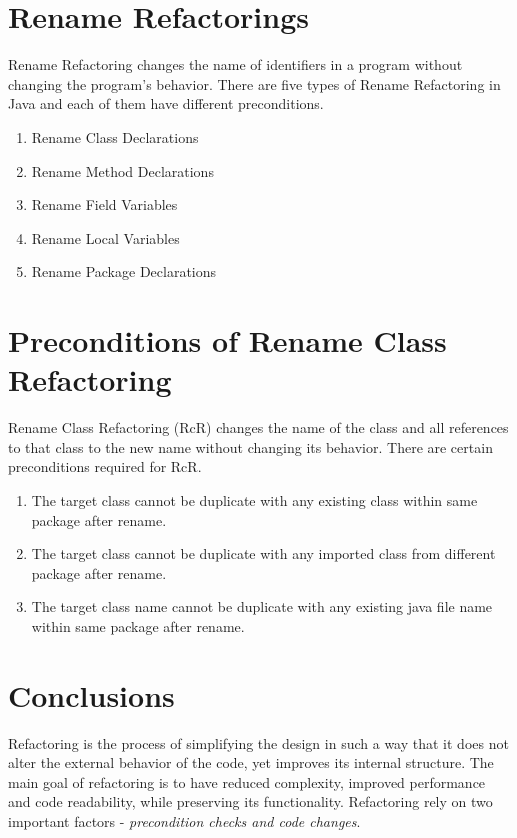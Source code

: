 \documentclass[10pt,conference]{IEEEtran}
\begin{document}
\section{\textbf{Rename Refactorings}}
Rename Refactoring changes the name of identifiers in a program without changing the program's behavior.
There are five types of Rename Refactoring in Java and each of them have different preconditions. 
\begin{enumerate}
	\item Rename Class Declarations 
	\item Rename Method Declarations  
	\item Rename Field Variables
	\item Rename Local Variables 
	\item Rename Package Declarations
\end{enumerate}

\section{\textbf{Preconditions of Rename Class Refactoring}}
Rename Class Refactoring (RcR) changes the name of the class and all references to that class to the new name without changing its behavior. There are certain preconditions required for RcR. 
\begin{enumerate}
	\item The target class cannot be duplicate with any existing class within same package after rename.
	\item The target class cannot be duplicate with any imported class from different package after rename.
	\item The target class name cannot be duplicate with any existing java file name within same package after rename.
\end{enumerate}

\label{sec:precon1}
	
\label{sec:precon2}

\label{sec:precon3}









\section{\textbf{Conclusions}}
Refactoring is the process of simplifying the design in such a way that it does not alter the external behavior of the code, yet improves its internal structure. The main goal of refactoring is to have reduced complexity, improved performance and code readability, while preserving its functionality. Refactoring rely on two important factors -  \emph{precondition checks and code changes}.
\end{document}
